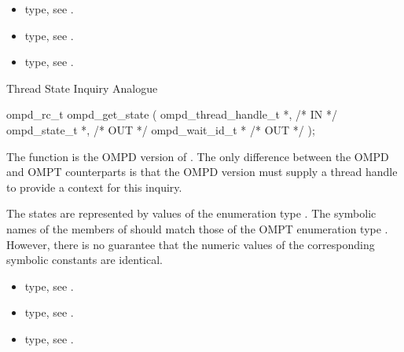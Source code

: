\crossreferences
\begin{itemize}
	\item {} type, see .
	\item {} type, see .
	\item {} type, see .
\end{itemize}


\summary
Thread State Inquiry Analogue
\format
\cspecificstart
\begin{boxedcode}
ompd\_rc\_t ompd\_get\_state (
  ompd\_thread\_handle\_t *,                             /* IN */
  ompd\_state\_t *,                                    /* OUT */
  ompd\_wait\_id\_t    *                                   /* OUT */
);
\end{boxedcode}
\cspecificend

\descr
The function  is the  OMPD version of
. 
The only difference between the OMPD and OMPT counterparts
is that the OMPD version must supply a thread handle to provide
a context for this inquiry.

\argdesc
The states are represented by values of the enumeration type
.
The symbolic names of the members of  should
match those of the OMPT enumeration type .
However, there is no guarantee that the numeric values of the corresponding
symbolic constants are identical.

\crossreferences
\begin{itemize}
	\item {} type, see .
	\item {} type, see .
	\item {} type, see .
\end{itemize}
